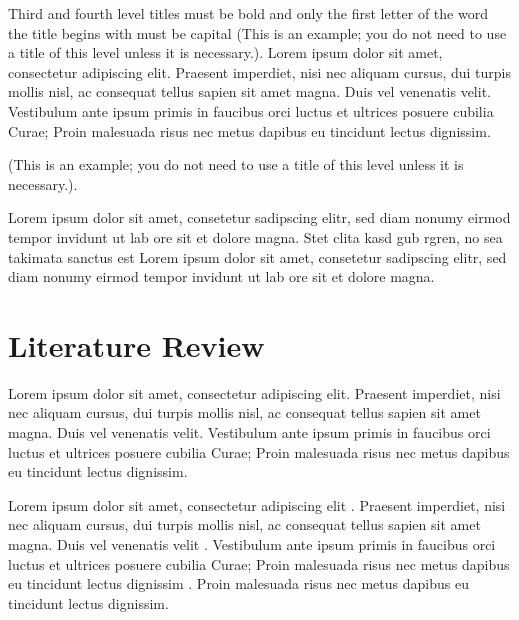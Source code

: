 Third and fourth level titles must be bold and only the first letter of the word the title begins with must be capital (This is an example; you do not need to use a title of this level unless it is necessary.).
Lorem ipsum dolor sit amet, consectetur adipiscing elit. Praesent imperdiet, nisi 
nec aliquam cursus, dui turpis mollis nisl, ac consequat tellus sapien sit amet 
magna. Duis vel venenatis velit. Vestibulum ante ipsum primis in faucibus orci 
luctus et ultrices posuere cubilia Curae; Proin malesuada risus nec metus dapibus 
eu tincidunt lectus dignissim.


(This is an example; you do not need to use a title of this level unless it is necessary.).

Lorem ipsum dolor sit amet, consetetur sadipscing elitr, sed diam nonumy eirmod tempor invidunt ut lab ore sit et dolore magna. Stet clita kasd gub rgren, no sea takimata sanctus est Lorem ipsum dolor sit amet, consetetur sadipscing elitr, sed diam nonumy eirmod tempor invidunt ut lab ore sit et dolore magna.

\section{Literature Review}\label{literaturereview}

Lorem ipsum dolor sit amet, consectetur adipiscing elit. Praesent imperdiet, nisi 
nec aliquam cursus, dui turpis mollis nisl, ac consequat tellus sapien sit amet 
magna. Duis vel venenatis velit. Vestibulum ante ipsum primis in faucibus orci 
luctus et ultrices posuere cubilia Curae; Proin malesuada risus nec metus dapibus 
eu tincidunt lectus dignissim. 

Lorem ipsum dolor sit amet, consectetur adipiscing elit \cite{HYP:HYP57}. Praesent imperdiet, nisi 
nec aliquam cursus, dui turpis mollis nisl, ac consequat tellus sapien sit amet 
magna. Duis vel venenatis velit \cite{Box:1990:TSA:574978}. Vestibulum ante ipsum primis in faucibus orci 
luctus et ultrices posuere cubilia Curae; Proin malesuada risus nec metus dapibus 
eu tincidunt lectus dignissim \cite{17590413}. Proin malesuada risus nec metus dapibus 
eu tincidunt lectus dignissim. 

